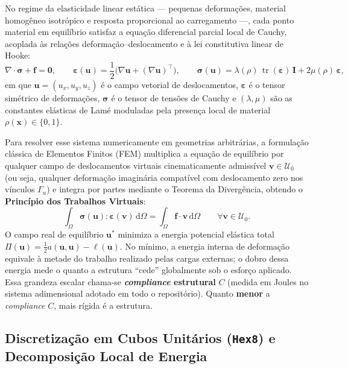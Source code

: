 \documentclass[11pt,a4paper]{article}
\begin{document}
No regime da elasticidade linear estática — pequenas deformações, material homogêneo isotrópico e resposta proporcional ao carregamento —, cada ponto material em equilíbrio satisfaz a equação diferencial parcial local de Cauchy, acoplada às relações deformação--deslocamento e à lei constitutiva linear de Hooke:
\begin{equation}
\nabla \cdot \boldsymbol{\sigma} + \mathbf{f} = \mathbf{0}, \qquad
\boldsymbol{\varepsilon}(\mathbf{u}) = \frac{1}{2}\Big(\nabla \mathbf{u} + (\nabla \mathbf{u})^\top\Big), \qquad
\boldsymbol{\sigma}(\mathbf{u}) = \lambda(\rho)\,\operatorname{tr}(\boldsymbol{\varepsilon})\,\mathbf{I} + 2\mu(\rho)\,\boldsymbol{\varepsilon},
\end{equation}
em que $\mathbf{u} = (u_x, u_y, u_z)$ é o campo vetorial de deslocamentos, $\boldsymbol{\varepsilon}$ é o tensor simétrico de deformações, $\boldsymbol{\sigma}$ é o tensor de tensões de Cauchy e $(\lambda, \mu)$ são as constantes elásticas de Lamé moduladas pela presença local de material $\rho(\mathbf{x}) \in \{0, 1\}$.

Para resolver esse sistema numericamente em geometrias arbitrárias, a formulação clássica de Elementos Finitos (FEM) multiplica a equação de equilíbrio por qualquer campo de deslocamentos virtuais cinematicamente admissível $\mathbf{v} \in \mathcal{U}_0$ (ou seja, qualquer deformação imaginária compatível com deslocamento zero nos vínculos $\Gamma_u$) e integra por partes mediante o Teorema da Divergência, obtendo o \textbf{Princípio dos Trabalhos Virtuais}:
\begin{equation}
\int_{\Omega} \boldsymbol{\sigma}(\mathbf{u}) : \boldsymbol{\varepsilon}(\mathbf{v})\,\mathrm{d}\Omega
= \int_{\Omega} \mathbf{f} \cdot \mathbf{v}\,\mathrm{d}\Omega
\qquad \forall \mathbf{v} \in \mathcal{U}_0.
\end{equation}
O campo real de equilíbrio $\mathbf{u}^*$ minimiza a energia potencial elástica total $\Pi(\mathbf{u}) = \frac{1}{2}a(\mathbf{u},\mathbf{u}) - \ell(\mathbf{u})$. No mínimo, a energia interna de deformação equivale à metade do trabalho realizado pelas cargas externas; o dobro dessa energia mede o quanto a estrutura ``cede'' globalmente sob o esforço aplicado. Essa grandeza escalar chama-se \textbf{\emph{compliance} estrutural} $C$ (medida em Joules no sistema adimensional adotado em todo o repositório). Quanto \textbf{menor} a \emph{compliance} $C$, mais rígida é a estrutura.

\subsection{Discretização em Cubos Unitários (\texttt{Hex8}) e Decomposição Local de Energia}
\end{document}
